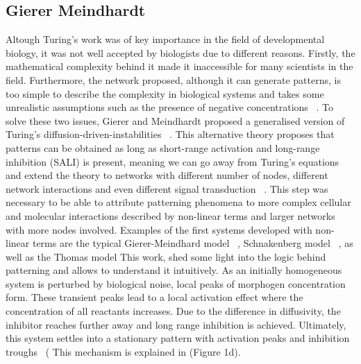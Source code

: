 \subsection{Gierer Meindhardt}
Altough Turing’s work was of key importance in the field of developmental biology, it was not well accepted by biologists due to different reasons.
Firstly, the mathematical complexity behind it made it inaccessible for many scientists in the field.
Furthermore, the network proposed, although it can generate patterns, is too simple to describe the complexity in biological systems and takes some unrealistic assumptions such as the presence of negative concentrations ~\parencite{Kondo2010a}.
To solve these two issues, Gierer and Meindhardt proposed a generalised version of Turing’s diffusion-driven-instabilities ~\parencite{Gierer1972}.
This alternative theory proposes that patterns can be obtained as long as short-range activation and long-range inhibition (SALI) is present, meaning we can go away from Turing’s equations and extend the theory to networks with different number of nodes, different network interactions and even different signal transduction ~\parencite{Murray1983, Rauch2004, Swindale1980}.
This step was necessary to be able to attribute patterning phenomena to more complex cellular and molecular interactions described by non-linear terms and larger networks with more nodes involved.
Examples of the first systems developed with non-linear terms are the typical Gierer-Meindhard model ~\parencite{Gierer1972}, Schnakenberg model ~\parencite{Schnakenberg1979}, as well as the Thomas model %
This work, shed some light into the logic behind patterning and allows to understand it intuitively.
As an initially homogeneous system is perturbed by biological noise, local peaks of morphogen concentration form.
These transient peaks lead to a local activation effect where the concentration of all reactants increases.
Due to the difference in diffusivity, the inhibitor reaches further away and long range inhibition is achieved.
Ultimately, this system settles into a stationary pattern with activation peaks and inhibition troughs ~\parencite{Gierer1972}(
This mechanism is explained in (Figure 1d).

